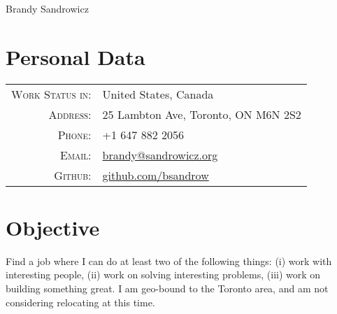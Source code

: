 \documentclass[a4paper,10pt]{article}
\begin{document}
    \pagestyle{empty} %

    
    \par{\centering
        {\Huge Brandy Sandrowicz }
        \bigskip\par}
    

    
        \section{Personal Data}
        \begin{tabular}{ r l }
        \textsc{Work Status in:}                & United States, Canada\\
        \textsc{Address:}                       & 25 Lambton Ave, Toronto, ON M6N 2S2\\
        \textsc{Phone:}                         & +1 647 882 2056\\
        \textsc{Email:}                         & \href{mailto:brandy@sandrowicz.org}{brandy@sandrowicz.org}\\
        \textsc{Github:}                        & \href{http://github.com/bsandrow}{github.com/bsandrow}\\
        \end{tabular}
    

    
        \section{Objective}
        Find a job where I can do at least two of the following things: (i) work with
        interesting people, (ii) work on solving interesting problems, (iii) work on
        building something great. I am geo-bound to the Toronto area, and am
        not considering relocating at this time.
    

    
\end{document}

